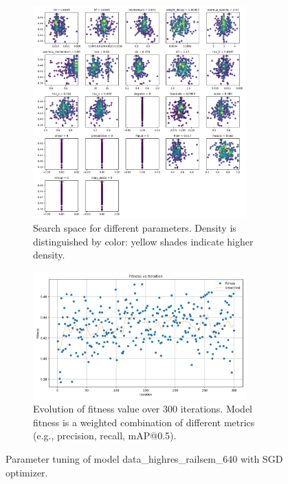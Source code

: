 \documentclass[Master,MDS,english]{BASE/twbook} %
\begin{document}
\begin{figure}[H]
\centering
\begin{subfigure}[t]{.5\textwidth}
  \centering
  \includegraphics[width=0.9\textwidth]{images/yolo/highres/sgd/tune_scatter_plots}
  \caption{Search space for different parameters. Density is distinguished by color: yellow shades indicate higher density.}
\end{subfigure}%
\begin{subfigure}[t]{.5\textwidth}
  \centering
  \includegraphics[width=0.9\textwidth]{images/yolo/highres/sgd/tune_fitness}
  \caption{Evolution of fitness value over 300 iterations. Model fitness is a weighted combination of different metrics (e.g., precision, recall, mAP@0.5).}
  \label{fig:images_from_videos}
\end{subfigure}
\caption{Parameter tuning of model data\_highres\_railsem\_640 with SGD optimizer. \\ }
\label{fig:yolo_tune_highres_sgd}
\end{figure}
\end{document}
